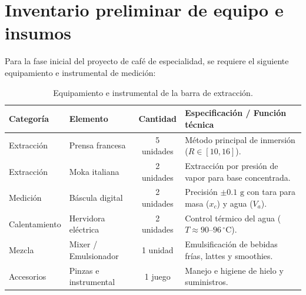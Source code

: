\documentclass{article}
\begin{document}

\section{Inventario preliminar de equipo e insumos}

Para la fase inicial del proyecto de café de especialidad, se requiere el siguiente equipamiento e instrumental de medición:

\begin{table}[H]
	\centering
	\caption{Equipamiento e instrumental de la barra de extracción.}
	\label{tab:equipamiento_barra}
	\vspace{6pt}
	\begin{tabular}{llcp{6.0cm}}
		\toprule
		\textbf{Categoría} & \textbf{Elemento} & \textbf{Cantidad} & \textbf{Especificación / Función técnica} \\
		\midrule
		Extracción & Prensa francesa & 5 unidades & Método principal de inmersión ($R \in [10, 16]$). \\
		Extracción & Moka italiana & 2 unidades & Extracción por presión de vapor para base concentrada. \\
		Medición & Báscula digital & 2 unidades & Precisión $\pm 0.1\text{ g}$ con tara para masa ($x_c$) y agua ($V_a$). \\
		Calentamiento & Hervidora eléctrica & 2 unidades & Control térmico del agua ($T \approx 90\text{--}96\,^\circ\text{C}$). \\
		Mezcla & Mixer / Emulsionador & 1 unidad & Emulsificación de bebidas frías, lattes y smoothies. \\
		Accesorios & Pinzas e instrumental & 1 juego & Manejo e higiene de hielo y suministros. \\
		\bottomrule
	\end{tabular}
\end{table}
\end{document}
